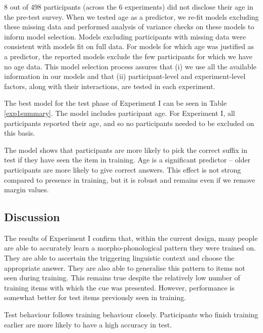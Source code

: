 \documentclass{frontiersSCNS} %
\begin{document}
8 out of 498 participants (across the 6 experiments) did not disclose their age in the pre-test survey. When we tested age as a predictor, we re-fit models excluding these missing data and performed analysis of variance checks on these models to inform model selection. Models excluding participants with missing data were consistent with models fit on full data. For models for which age was justified as a  predictor, the reported models exclude the few participants for which we have no age data.  This model selection process assures that (i) we use all the available information in our models and that (ii) participant-level and experiment-level factors, along with their interactions, are tested in each experiment.


The best model for the test phase of Experiment I can be seen in Table \ref{exp1summary}.  The model includes participant age.  For Experiment I, all participants reported their age, and so no participants needed to be excluded on this basis.

The model shows that participants are more likely to pick the correct suffix in test if they have seen the item in training. Age is a significant predictor -- older participants are more likely to give correct answers. This effect is not strong compared to presence in training, but it is robust and remains even if we remove margin values. 

\subsection{Discussion}

The results of Experiment I confirm that, within the current design, many people are able to accurately learn a morpho-phonological pattern they were trained on. They are able to ascertain the triggering linguistic context and choose the appropriate answer. They are also able to generalise this pattern to items not seen during training. This remains true despite the relatively low number of training items with which the cue was presented. However, performance is somewhat better for test items previously seen in training.

 Test behaviour follows training behaviour closely. Participants who finish training earlier are more likely to have a high accuracy in test.
\end{document}
